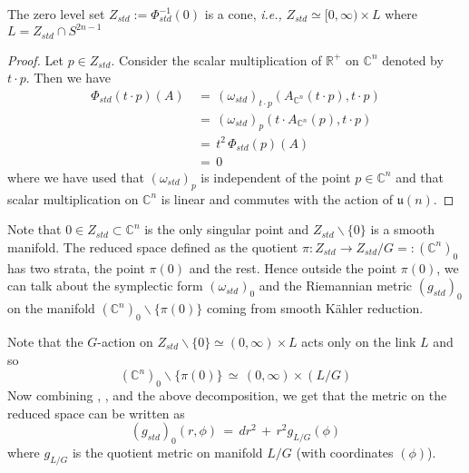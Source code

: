 \documentclass[a4paper,12pt]{article}
\newcommand{\C}{\mathbb{C}}
\newcommand{\R}{\mathbb{R}}
\newcommand{\inv}[1]{#1^{-1}}
\begin{document}
	\begin{lemma}\label{conelemma}
		The zero level set $Z_{std}:=\inv{\Phi_{std}}(0)$ is a cone,  \textit{i.e.,} $Z_{std} \simeq [0,\infty) \times L$ where $L=Z_{std}\cap S^{2n-1}$
	\end{lemma} 
	\begin{proof}
		Let $p\in Z_{std}$. Consider the scalar multiplication of $\R^+$ on $\C^n$ denoted by $t\cdot p$. Then we have
		\begin{equation*}
			\begin{split}
				\Phi_{std}(t\cdot p) (A) \,&=\, (\omega_{std})_{t\cdot p}(A_{\C^n}(t\cdot p), t\cdot p) \\
				&=\,  (\omega_{std})_p(t \cdot A_{\C^n}(p), t\cdot p)\\
				&=\, t^2 \, \Phi_{std}(p)(A)\\
				&=\, 0
			\end{split}
		\end{equation*}
		where we have used that $(\omega_{std})_{p}$ is independent of the point $p\in \C^n$ and that scalar multiplication on $\C^n$ is linear and commutes with the action of $\mathfrak{u}(n)$.
	\end{proof}
	
	Note that $0\in Z_{std} \subset \C^n$ is the only singular point and $Z_{std}\backslash\{0\}$ is a smooth manifold. The reduced space defined as the quotient $\pi:Z_{std} \to Z_{std}/G=:(\C^n)_0$ has two strata, the point $\pi(0)$ and the rest. Hence outside the point $\pi(0)$, we can talk about the symplectic form $(\omega_{std})_0$ and the Riemannian metric $(g_{std})_0$ on the manifold $(\C^n)_0\backslash\{\pi(0)\}$ coming from smooth K\"ahler reduction. 
	
	Note that the $G$-action on $Z_{std}\backslash\{0\} \simeq (0,\infty) \times L$ acts only on the link $L$ and so 
	\begin{equation}
		(\C^n)_0\backslash\{\pi(0)\} \,\simeq\, (0,\infty) \times (L/G)
	\end{equation}
	Now combining , , and the above decomposition, we get that the metric on the reduced space can be written as
	\begin{equation}\label{standardquotientmetric}
		(g_{std})_0(r,\phi) \,=\, dr^2 \,+\, r^2 g_{L/G}(\phi)
	\end{equation}
	where $g_{L/G}$ is the quotient metric on manifold $L/G$ (with coordinates $(\phi)$).
\end{document}
